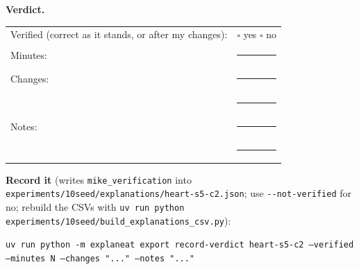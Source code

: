 \documentclass[a4paper,11pt]{article}
\begin{document}
\textbf{Verdict.}

\begin{tabularx}{\linewidth}{@{}lX@{}}
Verified (correct as it stands, or after my changes): & $\square$ yes \quad $\square$ no \\[4pt]
Minutes: & \rule{3cm}{0.4pt} \\[4pt]
Changes: & \rule{\linewidth}{0.4pt} \\[10pt]
 & \rule{\linewidth}{0.4pt} \\[4pt]
Notes: & \rule{\linewidth}{0.4pt} \\[10pt]
 & \rule{\linewidth}{0.4pt} \\
\end{tabularx}

\textbf{Record it} (writes \texttt{mike\_verification} into \texttt{experiments/10seed/explanations/heart-s5-c2.json}; use \texttt{-{}-not-verified} for no; rebuild the CSVs with \texttt{uv run python experiments/10seed/build\_explanations\_csv.py}):

{\footnotesize\raggedright\texttt{uv run python -m explaneat export record-verdict heart-s5-c2 --verified --minutes N --changes "..." --notes "..."}\par}


\clearpage


















\clearpage
\end{document}
